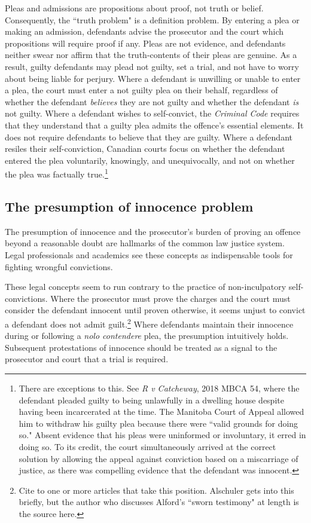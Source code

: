 Pleas and admissions are propositions about proof, not truth or belief. Consequently, the ``truth problem" is a definition problem. By entering a plea or making an admission, defendants advise the prosecutor and the court which propositions will require proof if any. Pleas are not evidence, and defendants neither swear nor affirm that the truth-contents of their pleas are genuine. As a result, guilty defendants may plead not guilty, set a trial, and not have to worry about being liable for perjury. Where a defendant is unwilling or unable to enter a plea, the court must enter a not guilty plea on their behalf, regardless of whether the defendant \textit{believes} they are not guilty and whether the defendant \textit{is} not guilty. Where a defendant wishes to self-convict, the \textit{Criminal Code} requires that they understand that a guilty plea admits the offence's essential elements. It does not require defendants to believe that they are guilty. Where a defendant resiles their self-conviction, Canadian courts focus on whether the defendant entered the plea voluntarily, knowingly, and unequivocally, and not on whether the plea was factually true.\footnote{There are exceptions to this. See \textit{R v Catcheway}, 2018 MBCA 54, where the defendant pleaded guilty to being unlawfully in a dwelling house despite having been incarcerated at the time. The Manitoba Court of Appeal allowed him to withdraw his guilty plea because there were ``valid grounds for doing so." Absent evidence that his pleas were uninformed or involuntary, it erred in doing so. To its credit, the court simultaneously arrived at the correct solution by allowing the appeal against conviction based on a miscarriage of justice, as there was compelling evidence that the defendant was innocent.}

\subsection{The presumption of innocence problem}

The presumption of innocence and the prosecutor's burden of proving an offence beyond a reasonable doubt are hallmarks of the common law justice system. Legal professionals and academics see these concepts as indispensable tools for fighting wrongful convictions.

These legal concepts seem to run contrary to the practice of non-inculpatory self-convictions. Where the prosecutor must prove the charges and the court must consider the defendant innocent until proven otherwise, it seems unjust to convict a defendant does not admit guilt.\footnote{Cite to one or more articles that take this position. Alschuler gets into this briefly, but the author who discusses Alford's ``sworn testimony" at length is the source here.} Where defendants maintain their innocence during or following a \textit{nolo contendere} plea, the presumption intuitively holds. Subsequent protestations of innocence should be treated as a signal to the prosecutor and court that a trial is required.

